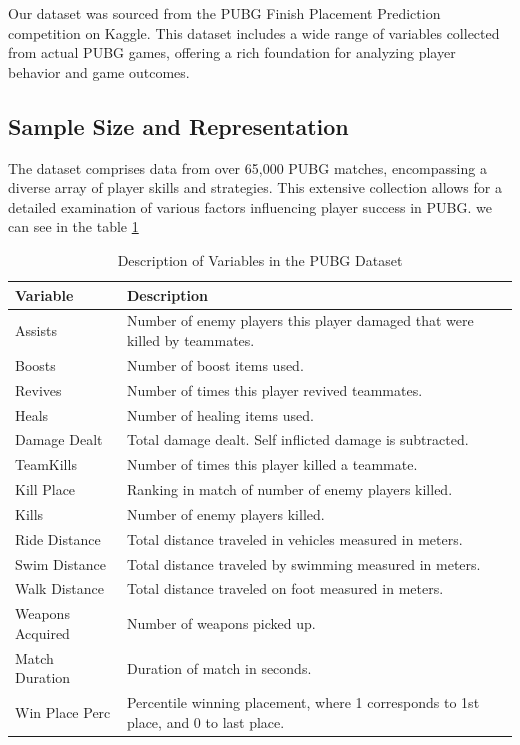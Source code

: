\documentclass[12pt]{article}
\begin{document}
Our dataset was sourced from the PUBG Finish Placement Prediction competition on Kaggle. This dataset includes a wide range of variables collected from actual PUBG games, offering a rich foundation for analyzing player behavior and game outcomes.

\subsection{Sample Size and Representation}

The dataset comprises data from over 65,000 PUBG matches, encompassing a diverse array of player skills and strategies. This extensive collection allows for a detailed examination of various factors influencing player success in PUBG. we can see in the table \ref{table:variables}

\begin{table}[h!]
	\centering
	\begin{tabular}{|l|p{10cm}|}
		\hline
		\textbf{Variable} & \textbf{Description} \\
		\hline
		Assists & Number of enemy players this player damaged that were killed by teammates. \\
		\hline
		Boosts & Number of boost items used. \\
		\hline
		Revives & Number of times this player revived teammates. \\
		\hline
		Heals & Number of healing items used. \\
		\hline
		Damage Dealt & Total damage dealt. Self inflicted damage is subtracted. \\
		\hline
		TeamKills & Number of times this player killed a teammate. \\
		\hline
		Kill Place & Ranking in match of number of enemy players killed. \\
		\hline
		Kills & Number of enemy players killed. \\
		\hline
		Ride Distance & Total distance traveled in vehicles measured in meters. \\
		\hline
		Swim Distance & Total distance traveled by swimming measured in meters. \\
		\hline
		Walk Distance & Total distance traveled on foot measured in meters. \\
		\hline
		Weapons Acquired & Number of weapons picked up. \\
		\hline
		Match Duration & Duration of match in seconds. \\
		\hline
		Win Place Perc & Percentile winning placement, where 1 corresponds to 1st place, and 0 to last place. \\
		\hline
	\end{tabular}
	\caption{Description of Variables in the PUBG Dataset}
	\label{table:variables}
\end{table}
\end{document}
